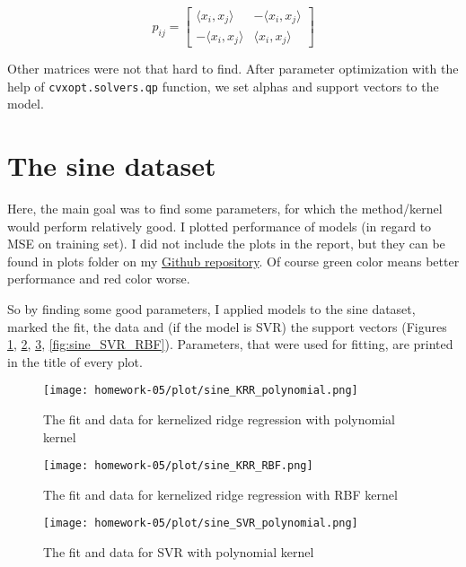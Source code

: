 \documentclass{article}
\begin{document}
\[
p_{ij} = \begin{bmatrix}
\langle x_i, x_j \rangle & -\langle x_i, x_j \rangle \\
-\langle x_i, x_j \rangle & \langle x_i, x_j \rangle
\end{bmatrix}
\]

Other matrices were not that hard to find. After parameter optimization with the help of \texttt{cvxopt.solvers.qp} function, we set alphas and support vectors to the model.

\section{The sine dataset}

Here, the main goal was to find some parameters, for which the method/kernel would perform relatively good. I plotted performance of models (in regard to MSE on training set). I did not include the plots in the report, but they can be found in plots folder on my \href{https://github.com/majbc1999/ml-for-data-science-homeworks} {Github repository}. Of course green color means better performance and red color worse.

So by finding some good parameters, I applied models to the sine dataset, marked the fit, the data and (if the model is SVR) the support vectors (Figures \ref{fig:sine_KRR_polynomial}, \ref{fig:sine_KRR_RBF}, \ref{fig:sine_SVR_polynomial}, \ref{fig:sine_SVR_RBF}). Parameters, that were used for fitting, are printed in the title of every plot. 

\begin{figure}[!h]
    \centering
    \texttt{[image: homework-05/plot/sine\_KRR\_polynomial.png]}
    \caption{The fit and data for kernelized ridge regression with polynomial kernel}
    \label{fig:sine_KRR_polynomial}
\end{figure}

\begin{figure}[!h]
    \centering
    \texttt{[image: homework-05/plot/sine\_KRR\_RBF.png]}
    \caption{The fit and data for kernelized ridge regression with RBF kernel}
    \label{fig:sine_KRR_RBF}
\end{figure}

\begin{figure}[!h]
    \centering
    \texttt{[image: homework-05/plot/sine\_SVR\_polynomial.png]}
    \caption{The fit and data for SVR with polynomial kernel}
    \label{fig:sine_SVR_polynomial}
\end{figure}
\end{document}
